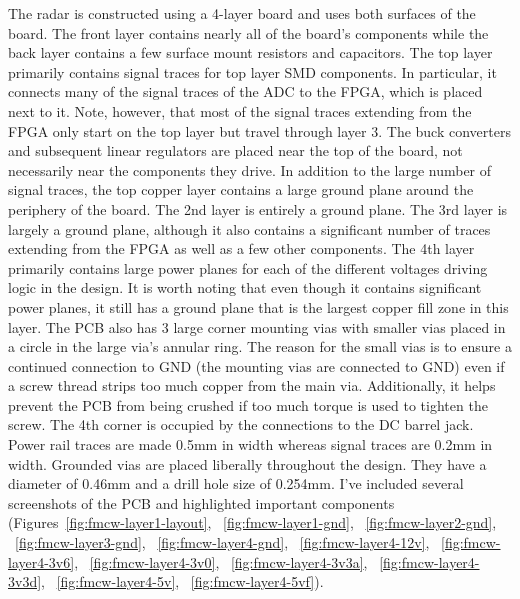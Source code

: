 \documentclass{default}
\begin{document}
The radar is constructed using a 4-layer board and uses both surfaces of the board. The front layer
contains nearly all of the board's components while the back layer contains a few surface mount
resistors and capacitors. The top layer primarily contains signal traces for top layer SMD
components. In particular, it connects many of the signal traces of the ADC to the FPGA, which is
placed next to it. Note, however, that most of the signal traces extending from the FPGA only start
on the top layer but travel through layer 3. The buck converters and subsequent linear regulators
are placed near the top of the board, not necessarily near the components they drive. In addition to
the large number of signal traces, the top copper layer contains a large ground plane around the
periphery of the board. The 2nd layer is entirely a ground plane. The 3rd layer is largely a ground
plane, although it also contains a significant number of traces extending from the FPGA as well as a
few other components. The 4th layer primarily contains large power planes for each of the different
voltages driving logic in the design. It is worth noting that even though it contains significant
power planes, it still has a ground plane that is the largest copper fill zone in this layer. The
PCB also has 3 large corner mounting vias with smaller vias placed in a circle in the large via's
annular ring. The reason for the small vias is to ensure a continued connection to GND (the mounting
vias are connected to GND) even if a screw thread strips too much copper from the main
via. Additionally, it helps prevent the PCB from being crushed if too much torque is used to tighten
the screw. The 4th corner is occupied by the connections to the DC barrel jack. Power rail traces
are made 0.5mm in width whereas signal traces are 0.2mm in width. Grounded vias are placed liberally
throughout the design. They have a diameter of 0.46mm and a drill hole size of 0.254mm. I've
included several screenshots of the PCB and highlighted important components
(Figures~\ref{fig:fmcw-layer1-layout}, ~\ref{fig:fmcw-layer1-gnd}, ~\ref{fig:fmcw-layer2-gnd},
~\ref{fig:fmcw-layer3-gnd}, ~\ref{fig:fmcw-layer4-gnd}, ~\ref{fig:fmcw-layer4-12v},
~\ref{fig:fmcw-layer4-3v6}, ~\ref{fig:fmcw-layer4-3v0}, ~\ref{fig:fmcw-layer4-3v3a},
~\ref{fig:fmcw-layer4-3v3d}, ~\ref{fig:fmcw-layer4-5v}, ~\ref{fig:fmcw-layer4-5vf}).
\end{document}
